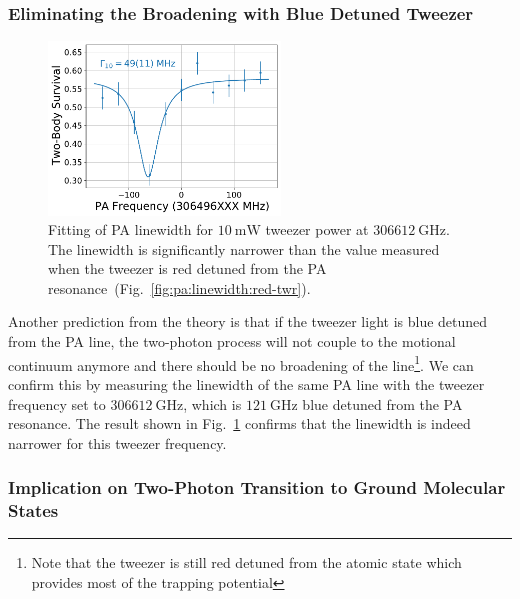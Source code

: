 \subsubsection{Eliminating the Broadening with Blue Detuned Tweezer}
\label{ch:pa:linewidth:blue-tweezer}
\begin{figure}
  \centering
  \includegraphics[width=0.55\textwidth]{figures/pa_spectrum_v12_blue_10.pdf}
  \caption[PA linewidth for blue detuned tweezer]{
    Fitting of PA linewidth for $10~\mathrm{mW}$ tweezer power at $306612~\mathrm{GHz}$.
    The linewidth is significantly narrower than the value measured when the tweezer
    is red detuned from the PA resonance~(Fig.~\ref{fig:pa:linewidth:red-twr}).
    \label{fig:pa:linewidth:blue-twr}}
\end{figure}
Another prediction from the theory is that if the tweezer light is blue detuned from
the PA line, the two-photon process will not couple to the motional continuum anymore
and there should be no broadening of the line\footnote{
  Note that the tweezer is still red detuned from the atomic state which
  provides most of the trapping potential}.
We can confirm this by measuring the linewidth of the same PA line with the tweezer
frequency set to $306612~\mathrm{GHz}$,
which is $121~\mathrm{GHz}$ blue detuned from the PA resonance.
The result shown in Fig.~\ref{fig:pa:linewidth:blue-twr}
confirms that the linewidth is indeed narrower for this tweezer frequency.

\subsubsection{Implication on Two-Photon Transition to Ground Molecular States}
\label{ch:pa:linewidth:raman}

